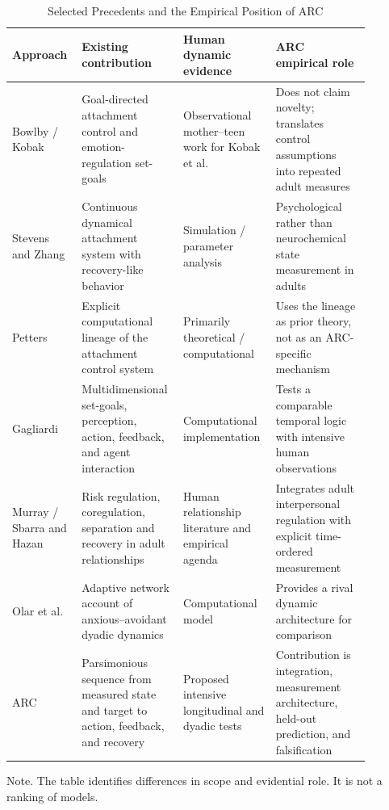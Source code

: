 \begin{table}[htbp]
\caption{Selected Precedents and the Empirical Position of ARC}
\label{tab:model-comparison}
\centering
\scriptsize
\setlength{\tabcolsep}{2pt}
\renewcommand{\arraystretch}{0.85}
\begin{threeparttable}
\begin{tabular}{p{0.17\linewidth}p{0.23\linewidth}p{0.23\linewidth}p{0.25\linewidth}}
\toprule
Approach & Existing contribution & Human dynamic evidence & ARC empirical role \\
\midrule
Bowlby / Kobak & Goal-directed attachment control and emotion-regulation set-goals & Observational mother--teen work for Kobak et al. & Does not claim novelty; translates control assumptions into repeated adult measures \\
Stevens and Zhang & Continuous dynamical attachment system with recovery-like behavior & Simulation / parameter analysis & Psychological rather than neurochemical state measurement in adults \\
Petters & Explicit computational lineage of the attachment control system & Primarily theoretical / computational & Uses the lineage as prior theory, not as an ARC-specific mechanism \\
Gagliardi & Multidimensional set-goals, perception, action, feedback, and agent interaction & Computational implementation & Tests a comparable temporal logic with intensive human observations \\
Murray / Sbarra and Hazan & Risk regulation, coregulation, separation and recovery in adult relationships & Human relationship literature and empirical agenda & Integrates adult interpersonal regulation with explicit time-ordered measurement \\
Olar et al. & Adaptive network account of anxious--avoidant dyadic dynamics & Computational model & Provides a rival dynamic architecture for comparison \\
ARC & Parsimonious sequence from measured state and target to action, feedback, and recovery & Proposed intensive longitudinal and dyadic tests & Contribution is integration, measurement architecture, held-out prediction, and falsification \\
\bottomrule
\end{tabular}
\begin{tablenotes}[flushleft]
\footnotesize
\item Note. The table identifies differences in scope and evidential role. It is not a ranking of models.
\end{tablenotes}
\end{threeparttable}
\end{table}
